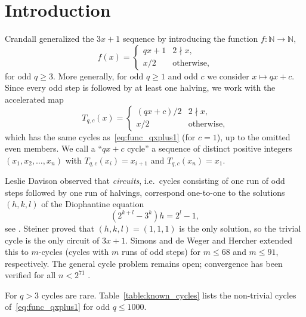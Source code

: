 \documentclass[12pt]{amsart}
\theoremstyle{definition}
\theoremstyle{remark}
\begin{document}
\section{Introduction}
\label{sec:introduction}
Crandall \cite{Crandall_1978} generalized the $3x+1$ sequence by introducing the function $f:\mathbb{N}\rightarrow\mathbb{N}$,
\begin{equation}
\label{eq:func_qxplus1}
f(x)=
\begin{cases}
qx+1	&	2\nmid x,\\
x/2		&	\text{otherwise,}
\end{cases}
\end{equation}
for odd $q\geq 3$. More generally, for odd $q\ge1$ and odd $c$ we consider $x\mapsto qx+c$. Since every odd step is followed by at least one halving, we work with the accelerated map
\begin{equation}
\label{eq:T}
T_{q,c}(x)=
\begin{cases}
(qx+c)/2	&	2\nmid x,\\
x/2		&	\text{otherwise,}
\end{cases}
\end{equation}
which has the same cycles as~\eqref{eq:func_qxplus1} (for $c=1$), up to the omitted even members. We call a ``$qx+c$ cycle'' a sequence of distinct positive integers $(x_1,x_2,\ldots,x_n)$ with $T_{q,c}(x_i)=x_{i+1}$ and $T_{q,c}(x_n)=x_1$.

Leslie Davison observed that \emph{circuits}, i.e.\ cycles consisting of one run of odd steps followed by one run of halvings, correspond one-to-one to the solutions $(h,k,l)$ of the Diophantine equation
\begin{equation}
(2^{k+l}-3^k)h=2^l-1,
\label{eq:diophantine_davison}
\end{equation}
see \cite[p.~67]{Lagarias_2010}. Steiner \cite{Steiner_1977} proved that $(h,k,l)=(1,1,1)$ is the only solution, so the trivial cycle is the only circuit of $3x+1$. Simons and de Weger \cite{Simons_deWeger_2005} and Hercher \cite{Hercher_2023} extended this to $m$-cycles (cycles with $m$ runs of odd steps) for $m\le 68$ and $m\le 91$, respectively. The general cycle problem remains open; convergence has been verified for all $n<2^{71}$ \cite{Barina_2021,Barina_2025}.

For $q>3$ cycles are rare. Table~\ref{table:known_cycles} lists the non-trivial cycles of~\eqref{eq:func_qxplus1} for odd $q\le1000$.
\end{document}
